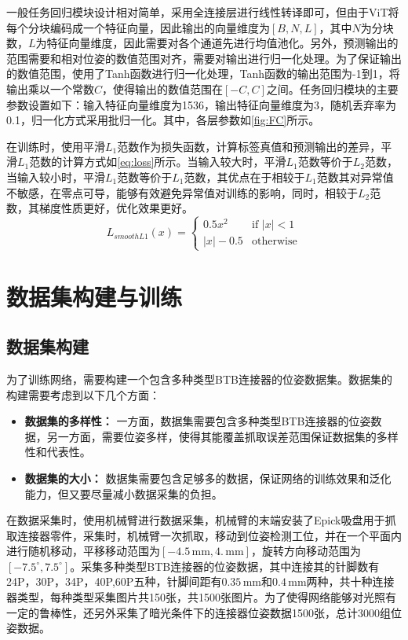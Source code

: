 \documentclass{Diploma}
\begin{document}
%

一般任务回归模块设计相对简单，采用全连接层进行线性转译即可，但由于ViT将每个分块编码成一个特征向量，因此输出的向量维度为$[B,N,L]$，其中$N$为分块数，$L$为特征向量维度，因此需要对各个通道先进行均值池化。另外，预测输出的范围需要和相对位姿的数值范围对齐，需要对输出进行归一化处理。为了保证输出的数值范围，使用了Tanh函数进行归一化处理，Tanh函数的输出范围为-1到1，将输出乘以一个常数$C$，使得输出的数值范围在$[-C,C]$之间。任务回归模块的主要参数设置如下：输入特征向量维度为1536，输出特征向量维度为3，随机丢弃率为0.1，归一化方式采用批归一化。其中，各层参数如\ref{fig:FC}所示。

在训练时，使用平滑$L_{1}$范数作为损失函数，计算标签真值和预测输出的差异，平滑$L_{1}$范数的计算方式如\eqref{eq:loss}所示。当输入较大时，平滑$L_{1}$范数等价于$L_2$范数，当输入较小时，平滑$L_{1}$范数等价于$L_{1}$范数，其优点在于相较于$L_1$范数其对异常值不敏感，在零点可导，能够有效避免异常值对训练的影响，同时，相较于$L_2$范数，其梯度性质更好，优化效果更好。
\begin{equation} \label{eq:loss}
  L_{smoothL1}(x) = \begin{cases}
    0.5x^2 & \text{if } |x| < 1 \\
    |x| - 0.5 & \text{otherwise}
  \end{cases}
\end{equation}

\section{数据集构建与训练}
\subsection{数据集构建}
为了训练网络，需要构建一个包含多种类型BTB连接器的位姿数据集。数据集的构建需要考虑到以下几个方面：
\begin{itemize}
  \item \textbf{数据集的多样性：} 一方面，数据集需要包含多种类型BTB连接器的位姿数据，另一方面，需要位姿多样，使得其能覆盖抓取误差范围保证数据集的多样性和代表性。
  \item \textbf{数据集的大小：} 数据集需要包含足够多的数据，保证网络的训练效果和泛化能力，但又要尽量减小数据采集的负担。
\end{itemize}

在数据采集时，使用机械臂进行数据采集，机械臂的末端安装了Epick吸盘用于抓取连接器零件，采集时，机械臂一次抓取，移动到位姿检测工位，并在一个平面内进行随机移动，平移移动范围为$[-4.5\,\mathrm{mm},4.\,\mathrm{mm}]$，旋转方向移动范围为$[-7.5^{\circ},7.5^{\circ}]$。采集多种类型BTB连接器的位姿数据，其中连接其的针脚数有24P，30P，34P，40P,60P五种，针脚间距有$0.35\,\mathrm{mm}$和$0.4\,\mathrm{mm}$两种，共十种连接器类型，每种类型采集图片共150张，共1500张图片。为了使得网络能够对光照有一定的鲁棒性，还另外采集了暗光条件下的连接器位姿数据1500张，总计3000组位姿数据。
\end{document}
